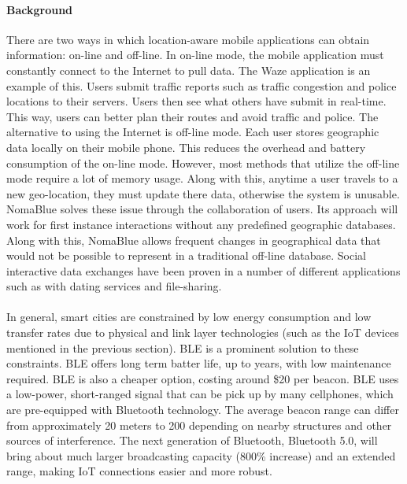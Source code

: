 \documentclass[a4paper,12pt]{article}
\begin{document}
\paragraph{Background}
There are two ways in which location-aware mobile applications can obtain information: on-line and off-line. In on-line mode, the mobile application must constantly connect to the Internet to pull data. The Waze application \cite{waze} is an example of this. Users submit traffic reports such as traffic congestion and police locations to their servers. Users then see what others have submit in real-time. This way, users can better plan their routes and avoid traffic and police. The alternative to using the Internet is off-line mode. Each user stores geographic data locally on their mobile phone. This reduces the overhead and battery consumption of the on-line mode. However, most methods that utilize the off-line mode require a lot of memory usage. Along with this, anytime a user travels to a new geo-location, they must update there data, otherwise the system is unusable. NomaBlue solves these issue through the collaboration of users. Its approach will work for first instance interactions without any predefined geographic databases. Along with this, NomaBlue allows frequent changes in geographical data that would not be possible to represent in a traditional off-line database. Social interactive data exchanges have been proven in a number of different applications such as with dating services and file-sharing.
\paragraph{}
In general, smart cities are constrained by low energy consumption and low transfer rates due to physical and link layer technologies (such as the IoT devices mentioned in the previous section). BLE is a prominent solution to these constraints. BLE offers long term batter life, up to years, with low maintenance required. BLE is also a cheaper option, costing around \$20 per beacon. BLE uses a low-power, short-ranged signal that can be pick up by many cellphones, which are pre-equipped with Bluetooth technology. The average beacon range can differ from approximately 20 meters to 200 depending on nearby structures and other sources of interference. The next generation of Bluetooth, Bluetooth 5.0, will bring about much larger broadcasting capacity (800\% increase) and an extended range, making IoT connections easier and more robust.
\end{document}

